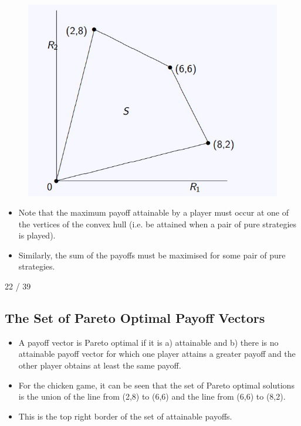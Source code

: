 \documentclass[]{report}
\begin{document}
\begin{figure}
\centering
\includegraphics[width=0.7\linewidth]{images/DR9-Slide47}
\caption{}
\label{fig:DR9-Slide47}
\end{figure}

\begin{itemize}
	\item Note that the maximum payoff attainable by a player must occur
	at one of the vertices of the convex hull (i.e. be attained when a
	pair of pure strategies is played).
\item	Similarly, the sum of the payoffs must be maximised for some pair
	of pure strategies.
\end{itemize}

22 / 39
\subsection{The Set of Pareto Optimal Payoff Vectors}
\begin{itemize}
	\item A payoff vector is Pareto optimal if it is a) attainable and b) there
	is no attainable payoff vector for which one player attains a greater
	payoff and the other player obtains at least the same payoff.
	\item For the chicken game, it can be seen that the set of Pareto optimal
	solutions is the union of the line from (2,8) to (6,6) and the line
	from (6,6) to (8,2).
	\item This is the top right border of the set of
	attainable payoffs.
\end{itemize}
\end{document}
